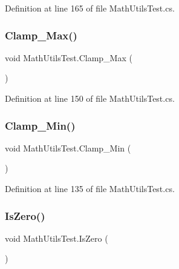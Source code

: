 Definition at line 165 of file Math\+Utils\+Test.\+cs.

\mbox{\label{class_math_utils_test_aac4f4fa5f05d08e8867109cc2e0562c0}} 
\subsubsection{\texorpdfstring{Clamp\+\_\+\+Max()}{Clamp\_Max()}}
{\footnotesize\ttfamily void Math\+Utils\+Test.\+Clamp\+\_\+\+Max (\begin{DoxyParamCaption}{ }\end{DoxyParamCaption})}



Definition at line 150 of file Math\+Utils\+Test.\+cs.

\mbox{\label{class_math_utils_test_aac8d35342b4acb267d1788f041cfd372}} 
\subsubsection{\texorpdfstring{Clamp\+\_\+\+Min()}{Clamp\_Min()}}
{\footnotesize\ttfamily void Math\+Utils\+Test.\+Clamp\+\_\+\+Min (\begin{DoxyParamCaption}{ }\end{DoxyParamCaption})}



Definition at line 135 of file Math\+Utils\+Test.\+cs.

\mbox{\label{class_math_utils_test_a516ab46e7d3d37bf326caddd90e6cd09}} 
\subsubsection{\texorpdfstring{Is\+Zero()}{IsZero()}}
{\footnotesize\ttfamily void Math\+Utils\+Test.\+Is\+Zero (\begin{DoxyParamCaption}{ }\end{DoxyParamCaption})}



